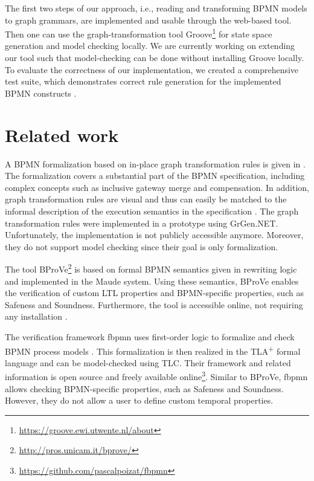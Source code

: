 \documentclass[submission, copyright, creativecommons]{eptcs}
\begin{document}
The first two steps of our approach, i.e., reading and transforming BPMN models to graph grammars, are implemented and usable through the web-based tool.
Then one can use the graph-transformation tool Groove\footnote{\url{https://groove.ewi.utwente.nl/about}} for state space generation and model checking locally.
We are currently working on extending our tool such that model-checking can be done without installing Groove locally.
To evaluate the correctness of our implementation, we created a comprehensive test suite, which demonstrates correct rule generation for the implemented BPMN constructs \cite{timkrauterArtifactsTERMGRAPH2022}.

\section{Related work} \label{sec:relatedWork}
A BPMN formalization based on in-place graph transformation rules is given in \cite{vangorpVisualTokenbasedFormalization2013}.
The formalization covers a substantial part of the BPMN specification, including complex concepts such as inclusive gateway merge and compensation.
In addition, graph transformation rules are visual and thus can easily be matched to the informal description of the execution semantics in the specification \cite{objectmanagementgroupBusinessProcessModel2013}.
The graph transformation rules were implemented in a prototype using GrGen.NET.
Unfortunately, the implementation is not publicly accessible anymore.
Moreover, they do not support model checking since their goal is only formalization.

The tool BProVe\footnote{\url{http://pros.unicam.it/bprove/}} is based on formal BPMN semantics given in rewriting logic and implemented in the Maude system.
Using these semantics, BProVe enables the verification of custom LTL properties and BPMN-specific properties, such as Safeness and Soundness.
Furthermore, the tool is accessible online, not requiring any installation \cite{corradiniFormalApproachAnalysis2021}.

The verification framework \textsf{fbpmn} uses first-order logic to formalize and check BPMN process models \cite{houhouFirstOrderLogicVerification2022}.
This formalization is then realized in the TLA\textsuperscript{+} formal language and can be model-checked using TLC.
Their framework and related information is open source and freely available online\footnote{\url{https://github.com/pascalpoizat/fbpmn}}.
Similar to BProVe, \textsf{fbpmn} allows checking BPMN-specific properties, such as Safeness and Soundness.
However, they do not allow a user to define custom temporal properties.
\end{document}
